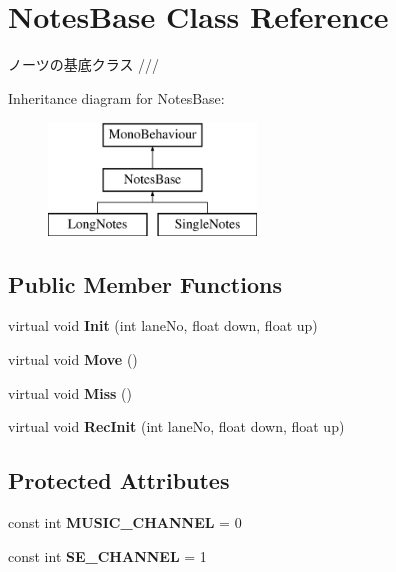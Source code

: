 \hypertarget{class_notes_base}{}\section{Notes\+Base Class Reference}
\label{class_notes_base}


ノーツの基底クラス ///  


Inheritance diagram for Notes\+Base\+:\begin{figure}[H]
\begin{center}
\leavevmode
\includegraphics[height=3.000000cm]{class_notes_base}
\end{center}
\end{figure}
\subsection*{Public Member Functions}
\begin{DoxyCompactItemize}
\item 
virtual void {\bfseries Init} (int lane\+No, float down, float up)\hypertarget{class_notes_base_a6060370c8dd6b076c6e735860b069b04}{}\label{class_notes_base_a6060370c8dd6b076c6e735860b069b04}

\item 
virtual void {\bfseries Move} ()\hypertarget{class_notes_base_ab9da30b4b9fddaf96084500d05f78d49}{}\label{class_notes_base_ab9da30b4b9fddaf96084500d05f78d49}

\item 
virtual void {\bfseries Miss} ()\hypertarget{class_notes_base_ab85838d156338efb707228bc318b88a2}{}\label{class_notes_base_ab85838d156338efb707228bc318b88a2}

\item 
virtual void {\bfseries Rec\+Init} (int lane\+No, float down, float up)\hypertarget{class_notes_base_a9875c7d08de04977aebc3431c7356fd4}{}\label{class_notes_base_a9875c7d08de04977aebc3431c7356fd4}

\end{DoxyCompactItemize}
\subsection*{Protected Attributes}
\begin{DoxyCompactItemize}
\item 
const int {\bfseries M\+U\+S\+I\+C\+\_\+\+C\+H\+A\+N\+N\+EL} = 0\hypertarget{class_notes_base_aa1710763eb690be2e6405ef4161526b8}{}\label{class_notes_base_aa1710763eb690be2e6405ef4161526b8}

\item 
const int {\bfseries S\+E\+\_\+\+C\+H\+A\+N\+N\+EL} = 1\hypertarget{class_notes_base_a359a03a7730e3a37db86086a0d1f7a6d}{}\label{class_notes_base_a359a03a7730e3a37db86086a0d1f7a6d}

\end{DoxyCompactItemize}
